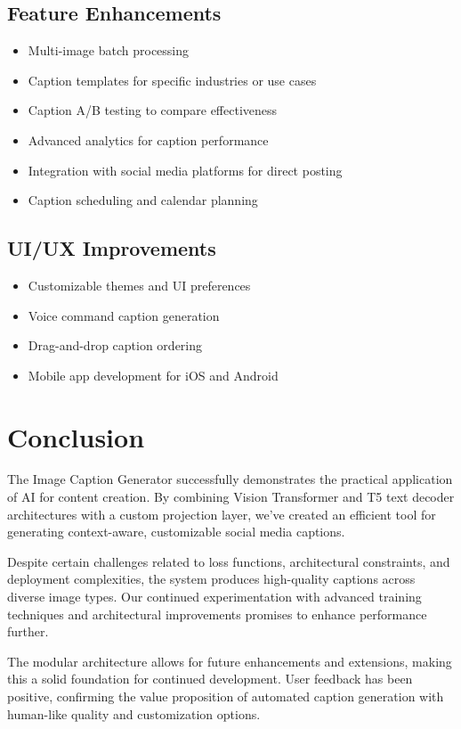 \documentclass[12pt,a4paper]{report}
\begin{document}
\section{Feature Enhancements}
\begin{itemize}
    \item Multi-image batch processing
    \item Caption templates for specific industries or use cases
    \item Caption A/B testing to compare effectiveness
    \item Advanced analytics for caption performance
    \item Integration with social media platforms for direct posting
    \item Caption scheduling and calendar planning
\end{itemize}

\section{UI/UX Improvements}
\begin{itemize}
    \item Customizable themes and UI preferences
    \item Voice command caption generation
    \item Drag-and-drop caption ordering
    \item Mobile app development for iOS and Android
\end{itemize}

\chapter{Conclusion}
The Image Caption Generator successfully demonstrates the practical application of AI for content creation. By combining Vision Transformer and T5 text decoder architectures with a custom projection layer, we've created an efficient tool for generating context-aware, customizable social media captions.

Despite certain challenges related to loss functions, architectural constraints, and deployment complexities, the system produces high-quality captions across diverse image types. Our continued experimentation with advanced training techniques and architectural improvements promises to enhance performance further.

The modular architecture allows for future enhancements and extensions, making this a solid foundation for continued development. User feedback has been positive, confirming the value proposition of automated caption generation with human-like quality and customization options.
\end{document}
